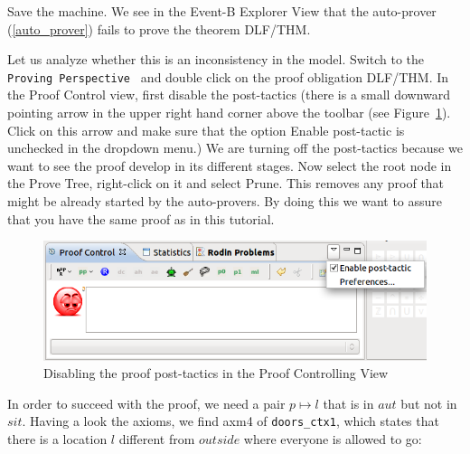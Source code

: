 Save the machine. We see in the \textsf{Event-B Explorer View} that the auto-prover (\ref{auto_prover}) fails to prove the theorem \textsf{DLF/THM}.


Let us analyze whether this is an inconsistency in the model. Switch to the \texttt{Proving Perspective } and double click on the proof obligation \textsf{DLF/THM}.
In the Proof Control view, first disable the post-tactics (there is a small downward pointing arrow in the upper right hand corner above the toolbar (see Figure~\ref{fig_tut_10_post_tactics}).
Click on this arrow and make sure that the option \textsf{Enable post-tactic} is unchecked in the dropdown menu.)
We are turning off the post-tactics because we want to see the proof develop in its different stages.
Now select the root node in the \textsf{Prove Tree}, right-click on it and select \textsf{Prune}.
This removes any proof that might be already started by the auto-provers.
By doing this we want to assure that you have the same proof as in this tutorial.

\begin{figure}[!ht]
  \begin{center}
    	\includegraphics{img/tutorial/tut_10_post_tactics.png}
    \caption{Disabling the proof post-tactics in the Proof Controlling View}
    \label{fig_tut_10_post_tactics}
  \end{center}
\end{figure}

In order to succeed with the proof, we need a pair $p \mapsto l$ that is in $aut$ but not in $sit$.
Having a look the axioms, we find  \textsf{axm4} of \texttt{doors\_ctx1}, which states that 
  there is a location $l$ different from $outside$ where everyone is allowed to go:

